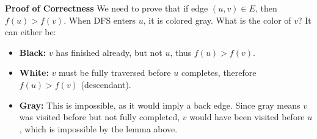 \begin{derivation} \textbf{Proof of Correctness}
    We need to prove that if edge \( (u, v) \in E \), then \( f(u) > f(v) \). When DFS enters \( u \), it is colored gray. What is the color of \( v \)? It can either be:
    \begin{itemize}
        \item \textbf{Black:} \( v \) has finished already, but not \( u \), thus \( f(u) > f(v) \).
        
        \item \textbf{White:} \( v \) must be fully traversed before \( u \) completes, therefore \( f(u) > f(v) \) (descendant).
        
        \item \textbf{Gray:} This is impossible, as it would imply a back edge. Since gray means \( v \) was visited before but not fully completed, \( v \) would have been visited before \( u \), which is impossible by the lemma above.
    \end{itemize}
\end{derivation}

